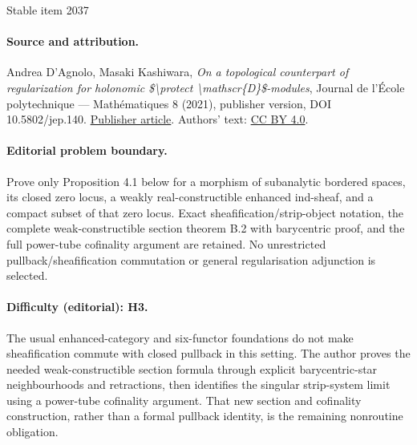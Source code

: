 \documentclass[11pt]{article}
\numberwithin{equation}{section}
\begin{document}
\begin{center}{\Large Stable item 2037}\end{center}
\paragraph{Source and attribution.}
Andrea D’Agnolo, Masaki Kashiwara, \emph{On a topological counterpart of regularization for holonomic \$\textbackslash{}protect \textbackslash{}mathscr\{D\}\$-modules}, Journal de l’École polytechnique — Mathématiques 8 (2021), publisher version, DOI 10.5802/jep.140. \href{https://jep.centre-mersenne.org/articles/10.5802/jep.140/}{Publisher article}. Authors' text: \href{https://creativecommons.org/licenses/by/4.0/}{CC BY 4.0}.
\paragraph{Editorial problem boundary.}
Prove only Proposition 4.1 below for a morphism of subanalytic bordered spaces, its closed zero locus, a weakly real-constructible enhanced ind-sheaf, and a compact subset of that zero locus. Exact sheafification/strip-object notation, the complete weak-constructible section theorem B.2 with barycentric proof, and the full power-tube cofinality argument are retained. No unrestricted pullback/sheafification commutation or general regularisation adjunction is selected.
\paragraph{Difficulty (editorial): H3.}
The usual enhanced-category and six-functor foundations do not make sheafification commute with closed pullback in this setting. The author proves the needed weak-constructible section formula through explicit barycentric-star neighbourhoods and retractions, then identifies the singular strip-system limit using a power-tube cofinality argument. That new section and cofinality construction, rather than a formal pullback identity, is the remaining nonroutine obligation.
\end{document}
